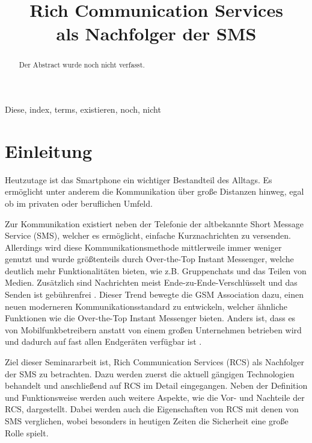 \documentclass[conference]{IEEEtran}
\begin{document}
\title{Rich Communication Services\\als Nachfolger der SMS}

\author{
}

\maketitle

\begin{abstract}
    Der Abstract wurde noch nicht verfasst.
\end{abstract}

\begin{IEEEkeywords}
    Diese, index, terms, existieren, noch, nicht
\end{IEEEkeywords}

\section{Einleitung}
Heutzutage ist das Smartphone ein wichtiger Bestandteil des Alltags.
Es ermöglicht unter anderem die Kommunikation über große Distanzen hinweg, egal ob im privaten oder beruflichen Umfeld.

Zur Kommunikation existiert neben der Telefonie der altbekannte Short Message Service (SMS), welcher es ermöglicht, einfache Kurznachrichten zu versenden.
Allerdings wird diese Kommunikationsmethode mittlerweile immer weniger genutzt und wurde größtenteils durch Over-the-Top Instant Messenger, welche deutlich mehr Funktionalitäten bieten, wie z.B. Gruppenchats und das Teilen von Medien.
Zusätzlich sind Nachrichten meist Ende-zu-Ende-Verschlüsselt und das Senden ist gebührenfrei \cite{ottmobinter}.
Dieser Trend bewegte die GSM Association dazu, einen neuen moderneren Kommunikationsstandard zu entwickeln, welcher ähnliche Funktionen wie die Over-the-Top Instant Messenger bieten.
Anders ist, dass es von Mobilfunkbetreibern anstatt von einem großen Unternehmen betrieben wird und dadurch auf fast allen Endgeräten verfügbar ist \cite{uniprof,rcsmno}.

Ziel dieser Seminararbeit ist, Rich Communication Services (RCS) als Nachfolger der SMS zu betrachten.
Dazu werden zuerst die aktuell gängigen Technologien behandelt und anschließend auf RCS im Detail eingegangen.
Neben der Definition und Funktionsweise werden auch weitere Aspekte, wie die Vor- und Nachteile der RCS, dargestellt.
Dabei werden auch die Eigenschaften von RCS mit denen von SMS verglichen, wobei besonders in heutigen Zeiten die Sicherheit eine große Rolle spielt.
\end{document}
